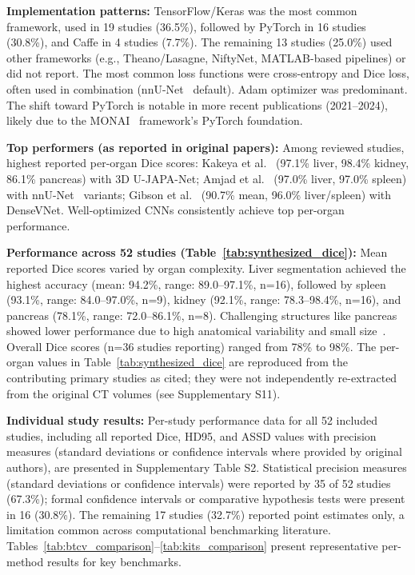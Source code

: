 \documentclass[conference]{IEEEtran}
\begin{document}
\textbf{Implementation patterns:} TensorFlow/Keras was the most common framework, used in 19 studies (36.5\%), followed by PyTorch in 16 studies (30.8\%), and Caffe in 4 studies (7.7\%). The remaining 13 studies (25.0\%) used other frameworks (e.g., Theano/Lasagne, NiftyNet, MATLAB-based pipelines) or did not report. The most common loss functions were cross-entropy and Dice loss, often used in combination (nnU-Net~\cite{isensee2021nnunet} default). Adam optimizer was predominant. The shift toward PyTorch is notable in more recent publications (2021--2024), likely due to the MONAI~\cite{monai2022} framework's PyTorch foundation.

\textbf{Top performers (as reported in original papers):} Among reviewed studies, highest reported per-organ Dice scores: Kakeya et al.\ \cite{kakeya2018ujapa} (97.1\% liver, 98.4\% kidney, 86.1\% pancreas) with 3D U-JAPA-Net; Amjad et al.\ \cite{amjad2022general} (97.0\% liver, 97.0\% spleen) with nnU-Net~\cite{isensee2021nnunet} variants; Gibson et al.\ \cite{gibson2018densevnet} (90.7\% mean, 96.0\% liver/spleen) with DenseVNet. Well-optimized CNNs consistently achieve top per-organ performance.

\textbf{Performance across 52 studies (Table~\ref{tab:synthesized_dice}):} Mean reported Dice scores varied by organ complexity. Liver segmentation achieved the highest accuracy (mean: 94.2\%, range: 89.0--97.1\%, n=16), followed by spleen (93.1\%, range: 84.0--97.0\%, n=9), kidney (92.1\%, range: 78.3--98.4\%, n=16), and pancreas (78.1\%, range: 72.0--86.1\%, n=8). Challenging structures like pancreas showed lower performance due to high anatomical variability and small size~\cite{oktay2018attention, gibson2018densevnet}. Overall Dice scores (n=36 studies reporting) ranged from 78\% to 98\%. The per-organ values in Table~\ref{tab:synthesized_dice} are reproduced from the contributing primary studies as cited; they were not independently re-extracted from the original CT volumes (see Supplementary S11).

\textbf{Individual study results:} Per-study performance data for all 52 included studies, including all reported Dice, HD95, and ASSD values with precision measures (standard deviations or confidence intervals where provided by original authors), are presented in Supplementary Table S2. Statistical precision measures (standard deviations or confidence intervals) were reported by 35 of 52 studies (67.3\%); formal confidence intervals or comparative hypothesis tests were present in 16 (30.8\%). The remaining 17 studies (32.7\%) reported point estimates only, a limitation common across computational benchmarking literature. Tables~\ref{tab:btcv_comparison}--\ref{tab:kits_comparison} present representative per-method results for key benchmarks.
\end{document}
